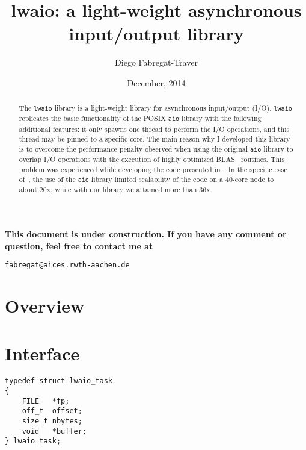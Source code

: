 \documentclass[a4paper,10pt]{article}
\newcommand{\lwaio}[0]{{\tt lwaio}}
\begin{document}
\title{lwaio: a light-weight asynchronous input/output library}

\author{Diego Fabregat-Traver}

\date{December, 2014}

\maketitle

\begin{abstract}
The \lwaio{} library is a light-weight library for asynchronous input/output (I/O).
\lwaio{} replicates the basic functionality of the POSIX {\tt aio} library with
the following additional features: it only spawns one thread to perform the I/O
operations, and this thread may be pinned to a specific core. The main reason
why I developed this library is to overcome the performance penalty observed when
using the original {\tt aio} library to overlap I/O operations
with the execution of highly optimized BLAS~\cite{BLAS3} routines.
This problem was experienced while developing the code presented in~\cite{OmicABEL-SingleTrait,OmicABEL-noMM}.
In the specific case of~\cite{OmicABEL-noMM}, the use of the {\tt aio} library limited scalability of the
code on a 40-core node to about 20x, while with our library we attained more than 36x.
\end{abstract}

\vspace{5mm}

{\Large \bf This document is under construction. If you have any comment or question, feel
free to contact me at
\begin{center} 
    {\tt fabregat@aices.rwth-aachen.de}
\end{center}}

\vspace{5mm}

\section{Overview}


\section{Interface}

\begin{verbatim}
typedef struct lwaio_task
{
    FILE   *fp;
    off_t  offset;
    size_t nbytes;
    void   *buffer;
} lwaio_task;
\end{verbatim}
\end{document}
